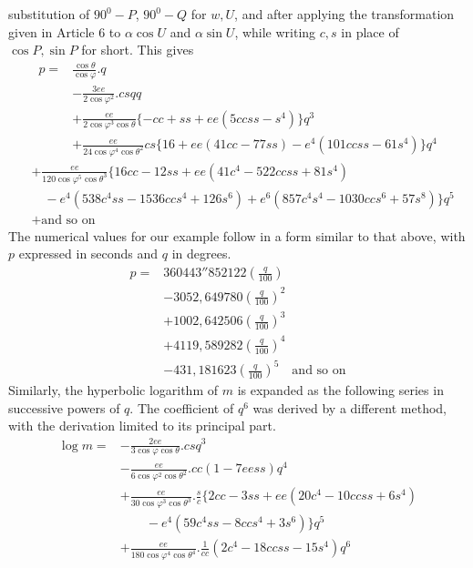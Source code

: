 %
substitution of \(90^0-P\), \(90^0-Q\) for \(w,U\), and after applying the transformation given in Article 6 to \(\alpha\cos U\) and \(\alpha\sin U\), while writing \(c,s\) in place of \(\cos P,\sin P\) for short. This gives
\[
\begin{aligned}
p={}&\frac{\cos\theta}{\cos\varphi}\mathord{.}q\\
&-\frac{3ee}{2\cos\varphi^2}\mathord{.}csqq\\
&+\frac{ee}{2\cos\varphi^3\cos\theta}\{-cc+ss+ee(5ccss-s^4)\}q^3\\
&+\frac{ee}{24\cos\varphi^4\cos\theta^2}cs\{16+ee(41cc-77ss)-e^4(101ccss-61s^4)\}q^4
\end{aligned}
\]
\[
\begin{aligned}
&+\frac{ee}{120\cos\varphi^5\cos\theta^3}\{16cc-12ss+ee(41c^4-522ccss+81s^4)\\
&\quad-e^4(538c^4ss-1536ccs^4+126s^6)+e^6(857c^4s^4-1030ccs^6+57s^8)\}q^5\\
&+\text{and so on}
\end{aligned}
\]
\indent The numerical values for our example follow in a form similar to that above, with \(p\) expressed in seconds and \(q\) in degrees.
\[
\begin{aligned}
p={}&360443''852122(\frac{q}{100})\\
&-3052{,}649780(\frac{q}{100})^2\\
&+1002{,}642506(\frac{q}{100})^3\\
&+4119{,}589282(\frac{q}{100})^4\\
&-431{,}181623(\frac{q}{100})^5\quad\text{and so on}
\end{aligned}
\]
\indent Similarly, the hyperbolic logarithm of \(m\) is expanded as the following series in successive powers of \(q\). The coefficient of \(q^6\) was derived by a different method, with the derivation limited to its principal part.
\[
\begin{aligned}
\log m={}&-\frac{2ee}{3\cos\varphi\cos\theta}\mathord{.}csq^3\\
&-\frac{ee}{6\cos\varphi^2\cos\theta^2}\mathord{.}cc(1-7eess)q^4\\
&+\frac{ee}{30\cos\varphi^3\cos\theta^3}\mathord{.}\frac{s}{c}\{2cc-3ss+ee(20c^4-10ccss+6s^4)\\
&\qquad-e^4(59c^4ss-8ccs^4+3s^6)\}q^5\\
&+\frac{ee}{180\cos\varphi^4\cos\theta^4}\mathord{.}\frac{1}{cc}(2c^4-18ccss-15s^4)q^6
\end{aligned}
\]
